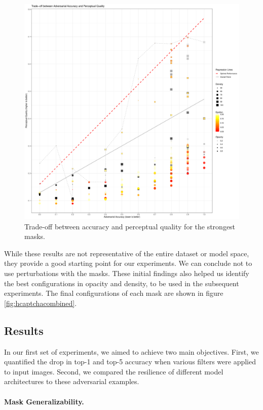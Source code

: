 \documentclass[a4paper, oneside]{discothesis}
\begin{document}
\begin{figure}
	\centering
	\includegraphics[width=1\columnwidth]{figures/tradeoff-2.pdf}
	\caption{Trade-off between accuracy and perceptual quality for the strongest masks.}
	\label{fig:tradeoff-2}
\end{figure}

While these results are not representative of the entire dataset or model space, they provide a good starting point for our experiments. We can conclude not to use perturbations with the masks. These initial findings also helped us identify the best configurations in opacity and density, to be used in the subsequent experiments. The final configurations of each mask are shown in figure \ref{fig:hcaptchacombined}.

\subsection{Results}

In our first set of experiments, we aimed to achieve two main objectives. First, we quantified the drop in top-1 and top-5 accuracy when various filters were applied to input images. Second, we compared the resilience of different model architectures to these adversarial examples.

\paragraph{Mask Generalizability.}
\end{document}
